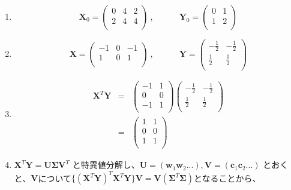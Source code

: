 \begin{enumerate}
\item 
\[
{\mathbf X}_0 = \left( 
\begin{array}{rrr}
0 & 4 & 2 \\
2 & 4 & 4 \\
\end{array}
\right)\ , \hspace{3em}
{\mathbf Y}_0 = \left( 
\begin{array}{rrr}
0 & 1\\
1 & 2\\
\end{array}
\right)
\]
\item 
\[
{\mathbf X} = \left( 
\begin{array}{rrr}
-1 & 0 & -1 \\
 1 & 0 &  1\\
\end{array}
\right)\ , \hspace{3em}
{\mathbf Y} = \left( 
\begin{array}{rrr}
-\frac{1}{2} & -\frac{1}{2}\\
\frac{1}{2} & \frac{1}{2}\\
\end{array}
\right)
\]
\item
\begin{eqnarray*}
{\mathbf X}^T{\mathbf Y} 
& = & 
\left(
\begin{array}{rr}
-1 & 1\\
 0 & 0\\
-1 & 1\\
\end{array}
\right)
\left( 
\begin{array}{rrr}
-\frac{1}{2} & -\frac{1}{2}\\
\frac{1}{2} & \frac{1}{2}\\
\end{array}
\right) \\
& = & 
\left(
\begin{array}{rr}
1 & 1\\
0 & 0\\
1 & 1\\
\end{array}
\right)
\end{eqnarray*}
\item \({\mathbf X}^T{\mathbf Y} = {\mathbf U}{\mathbf \Sigma}{\mathbf V}^T\) と特異値分解し、\({\mathbf U} = ( {\mathbf w}_1 {\mathbf w}_2 ...), {\mathbf V} = ( {\mathbf c}_1 {\mathbf c}_2 ...)\) とおくと、\({\mathbf V}\)について\(\{({\mathbf X}^T{\mathbf Y})^T{\mathbf X}^T{\mathbf Y}\}{\mathbf V} = {\mathbf V}({\mathbf \Sigma}^T{\mathbf \Sigma})\)となることから、

\end{enumerate}
